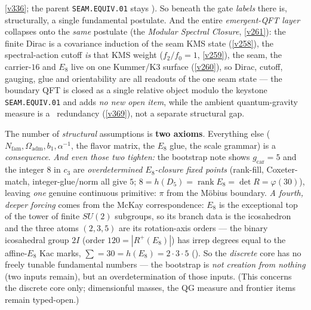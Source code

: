 \documentclass[11pt,a4paper]{article}
\newcommand{\cthree}{c_3}
\newcommand{\gcar}{g_{\mathrm{car}}}
\newcommand{\Nfam}{N_{\mathrm{fam}}}
\newcommand{\Oadm}{\Omega_{\mathrm{adm}}}
\newcommand{\ainv}{\alpha^{-1}}
\begin{document}
\vref{v336}; the parent \texttt{SEAM.EQUIV.01} stays \mO). So beneath the gate \emph{labels} there is,
structurally, a single fundamental postulate. And the entire \emph{emergent-QFT layer} collapses onto the
\emph{same} postulate (the \emph{Modular Spectral Closure}, \vref{v261}): the finite Dirac is a
covariance induction of the seam KMS state (\vref{v258}), the spectral-action cutoff \emph{is} that KMS
weight ($f_2/f_0=1$, \vref{v259}), the seam, the carrier-$16$ and $E_8$ live on one Kummer/K3 surface
(\vref{v260}), so Dirac, cutoff, gauging, glue and orientability are all readouts of the one seam state ---
the boundary QFT is closed as a single relative object modulo the keystone \texttt{SEAM.EQUIV.01} and adds
\emph{no new open item}, while the ambient quantum-gravity measure is a \mC\ redundancy (\vref{v369}), not a separate
structural gap.
 

\begin{winboxnb}
The number of \emph{structural} assumptions is \textbf{two axioms}. Everything else
($\Nfam,\Oadm,b_1,\ainv$, the flavor matrix, the $E_8$ glue, the scale grammar) is a
\emph{consequence}. \emph{And even those two tighten:} the
bootstrap note shows $\gcar=5$ and the integer $8$ in $\cthree$ are \emph{overdetermined $E_8$-closure
fixed points} (rank-fill, Coxeter-match, integer-glue/norm all give $5$; $8=h(D_5)=\operatorname{rank}E_8=\det R=\varphi(30)$),
leaving \emph{one} genuine continuous primitive: $\pi$ from the Möbius boundary. \emph{A fourth, deeper
forcing} comes from the McKay correspondence: $E_8$ is the exceptional top of the tower of finite $SU(2)$
subgroups, so its branch data is the icosahedron and the three atoms $(2,3,5)$ are its rotation-axis orders
--- the binary icosahedral group $2I$ (order $120=|R^+(E_8)|$) has irrep degrees equal to the affine-$E_8$
Kac marks, $\sum=30=h(E_8)=2{\cdot}3{\cdot}5$ (). So the \emph{discrete}
core has no freely tunable fundamental numbers --- the bootstrap is \emph{not creation from nothing} (two
inputs remain), but an overdetermination of those inputs. (This concerns the discrete core only;
dimensionful masses, the QG measure and frontier items remain typed-open.)
   
\end{winboxnb}

\end{document}

